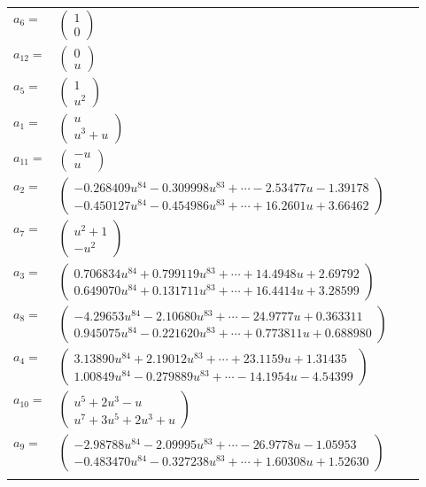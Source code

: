 \documentclass[1p]{elsarticle_modified}
\theoremstyle{definition}
\begin{document}
\begin{tabular}{m{7pt} m{180pt} m{7pt} m{180pt} }
\flushright $a_{6}=$&$\begin{pmatrix}1\\0\end{pmatrix}$ \\
\flushright $a_{12}=$&$\begin{pmatrix}0\\u\end{pmatrix}$ \\
\flushright $a_{5}=$&$\begin{pmatrix}1\\u^2\end{pmatrix}$ \\
\flushright $a_{1}=$&$\begin{pmatrix}u\\u^3+u\end{pmatrix}$ \\
\flushright $a_{11}=$&$\begin{pmatrix}- u\\u\end{pmatrix}$ \\
\flushright $a_{2}=$&$\begin{pmatrix}-0.268409 u^{84}-0.309998 u^{83}+\cdots-2.53477 u-1.39178\\-0.450127 u^{84}-0.454986 u^{83}+\cdots+16.2601 u+3.66462\end{pmatrix}$ \\
\flushright $a_{7}=$&$\begin{pmatrix}u^2+1\\- u^2\end{pmatrix}$ \\
\flushright $a_{3}=$&$\begin{pmatrix}0.706834 u^{84}+0.799119 u^{83}+\cdots+14.4948 u+2.69792\\0.649070 u^{84}+0.131711 u^{83}+\cdots+16.4414 u+3.28599\end{pmatrix}$ \\
\flushright $a_{8}=$&$\begin{pmatrix}-4.29653 u^{84}-2.10680 u^{83}+\cdots-24.9777 u+0.363311\\0.945075 u^{84}-0.221620 u^{83}+\cdots+0.773811 u+0.688980\end{pmatrix}$ \\
\flushright $a_{4}=$&$\begin{pmatrix}3.13890 u^{84}+2.19012 u^{83}+\cdots+23.1159 u+1.31435\\1.00849 u^{84}-0.279889 u^{83}+\cdots-14.1954 u-4.54399\end{pmatrix}$ \\
\flushright $a_{10}=$&$\begin{pmatrix}u^5+2 u^3- u\\u^7+3 u^5+2 u^3+u\end{pmatrix}$ \\
\flushright $a_{9}=$&$\begin{pmatrix}-2.98788 u^{84}-2.09995 u^{83}+\cdots-26.9778 u-1.05953\\-0.483470 u^{84}-0.327238 u^{83}+\cdots+1.60308 u+1.52630\end{pmatrix}$\\&\end{tabular}
\end{document}
